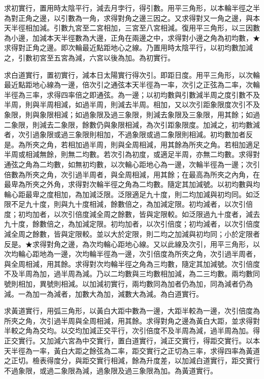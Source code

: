 \begin{pinyinscope}
求初實行，置用時太陰平行，減去月孛行，得引數。用平三角形，以本輪半徑之半為對正角之邊，以引數為一角，求得對角之邊三因之。又求得對又一角之邊，與本天半徑相加減。引數九宮至二宮相加，三宮至八宮相減。復用平三角形，以三因數為小邊，加減本天半徑數為大邊，正角在兩邊之中，求得對小邊之角為初均數，★求得對正角之邊。即次輪最近點距地心之線。乃置用時太陰平行，以初均數加減之，引數初宮至五宮為減，六宮以後為加。為初實行。

求白道實行，置初實行，減本日太陽實行得次引。即距日度。用平三角形，以次輪最近點距地心線為一邊，倍次引之通弦本天半徑為一率，次引之正弦為二率，次輪半徑為三率，求得四率倍之即通弦。為一邊；以初均數與引數減半周之度引數不及半周，則與半周相減，如過半周，則減去半周。相加，又以次引距象限度次引不及象限，則與象限相減；如過象限及過三象限，則減去象限及三象限，用其餘；如過二象限，則減去二象限，餘數仍與象限相減，為次引距象限度。加減之，初均數減者，次引過象限或過三象限則相加，不過象限或過二象限則相減。初均數加者反是。為所夾之角，若相加過半周，則與全周相減，用其餘為所夾之角。若相加適足半周或相減無餘，則無二均數。若次引為初度，或適足半周，亦無二均數。求得對通弦之角為二均數，如無初均數，以次輪心距地心為一邊，次輪半徑為一邊；次引倍數為所夾之角，次引過半周者，與全周相減，用其餘；在最高為所夾之內角，在最卑為所夾之外角，求得對次輪半徑之角為二均數。隨定其加減號。以初均數與均輪心距最卑之度相加，為加減泛限。泛限適足九十度，則二均加減與初均同。如泛限不足九十度，則與九十度相減，餘數倍之，為加減定限。初均減者，以次引倍度；初均加者，以次引倍度減全周之餘數，皆與定限較。如泛限過九十度者，減去九十度，餘數倍之，為加減定限。初均加者，以次引倍度；初均減者，以次引倍度減全周之餘數，皆與定限較。並以大於定限，則二均之加減與初均同；小於定限者反是。★求得對角之邊，為次均輪心距地心線。又以此線及次引，用平三角形，以次均輪心距地為一邊，次均輪半徑為一邊，次引倍度為所夾之角，次引過半周者，與全周相減，用其餘。求得對次均輪半徑之角為三均數，隨定其加減號。次引倍度不及半周為加，過半周為減。乃以二均數與三均數相加減，為二三均數。兩均數同號則相加，異號則相減。以加減初實行，兩均數同為加者仍為加，同為減者仍為減。一為加一為減者，加數大為加，減數大為減。為白道實行。

求黃道實行，用弧三角形，以黃白大距中數為一邊，大距半較為一邊，次引倍度為所夾之角，次引過半周與全周相減，用其餘。求得對角之邊為黃白大距，並求得對半較之角為交均。以交均加減正交平行，次引倍度不及半周為減，過半周為加。得正交實行。又加減六宮為中交實行，置白道實行，減正交實行，得距交實行。以本天半徑為一率，黃白大距之餘弦為二率，距交實行之正切為三率，求得四率為黃道之正切。檢表得度分，與距交實行相減，餘為升度差，以加減白道實行，距交實行不過象限，或過二象限為減，過象限及過三象限為加。為黃道實行。


\end{pinyinscope}

